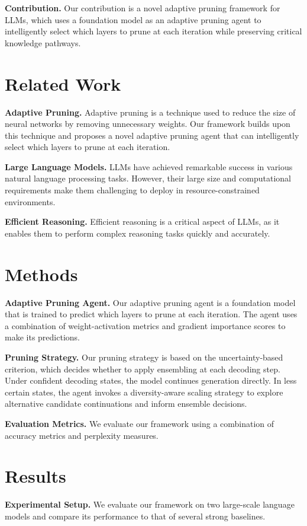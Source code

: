 \documentclass{article}
\begin{document}
        \textbf{Contribution.} Our contribution is a novel adaptive pruning framework for LLMs, which uses a foundation model as an adaptive pruning agent to intelligently select which layers to prune at each iteration while preserving critical knowledge pathways.

        \section{Related Work}
        \label{sec:related}
        \setlength{\parindent}{0pt}
        \textbf{Adaptive Pruning.} Adaptive pruning is a technique used to reduce the size of neural networks by removing unnecessary weights. Our framework builds upon this technique and proposes a novel adaptive pruning agent that can intelligently select which layers to prune at each iteration.

        \textbf{Large Language Models.} LLMs have achieved remarkable success in various natural language processing tasks. However, their large size and computational requirements make them challenging to deploy in resource-constrained environments.

        \textbf{Efficient Reasoning.} Efficient reasoning is a critical aspect of LLMs, as it enables them to perform complex reasoning tasks quickly and accurately.

        \section{Methods}
        \label{sec:methods}
        \setlength{\parindent}{0pt}
        \textbf{Adaptive Pruning Agent.} Our adaptive pruning agent is a foundation model that is trained to predict which layers to prune at each iteration. The agent uses a combination of weight-activation metrics and gradient importance scores to make its predictions.

        \textbf{Pruning Strategy.} Our pruning strategy is based on the uncertainty-based criterion, which decides whether to apply ensembling at each decoding step. Under confident decoding states, the model continues generation directly. In less certain states, the agent invokes a diversity-aware scaling strategy to explore alternative candidate continuations and inform ensemble decisions.

        \textbf{Evaluation Metrics.} We evaluate our framework using a combination of accuracy metrics and perplexity measures.

        \section{Results}
        \label{sec:results}
        \setlength{\parindent}{0pt}
        \textbf{Experimental Setup.} We evaluate our framework on two large-scale language models and compare its performance to that of several strong baselines.
\end{document}
